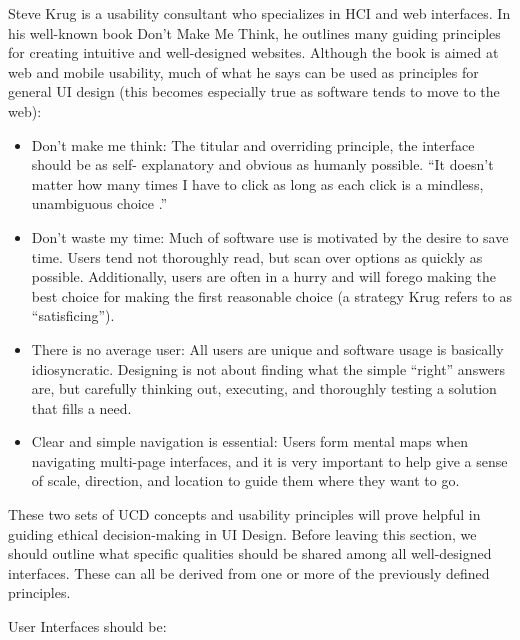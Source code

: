 \documentclass[12pt, oneside]{article}
\begin{document}
Steve Krug is a usability consultant who specializes in HCI and web interfaces. In his well-known book Don't Make Me Think, he outlines many guiding principles for creating intuitive and well-designed websites. Although the book is aimed at web and mobile usability, much of what he says can be used as principles for general UI design (this becomes especially true as software tends to move to the web):

\begin{itemize}
\raggedright
    \item Don't make me think: The titular and overriding principle, the interface should be as self- explanatory and obvious as humanly possible. ``It doesn't matter how many times I have to click as long as each click is a mindless, unambiguous choice \cite[p.~43]{krug_2014}.''
    \item Don't waste my time: Much of software use is motivated by the desire to save time. Users tend not thoroughly read, but scan over options as quickly as possible. Additionally, users are often in a hurry and will forego making the best choice for making the first reasonable choice (a strategy Krug refers to as ``satisficing'').
    \item There is no average user: All users are unique and software usage is basically idiosyncratic. Designing is not about finding what the simple ``right'' answers are, but carefully thinking out, executing, and thoroughly testing a solution that fills a need.
    \item Clear and simple navigation is essential: Users form mental maps when navigating multi-page interfaces, and it is very important to help give a sense of scale, direction, and location to guide them where they want to go.
\end{itemize}

These two sets of UCD concepts and usability principles will prove helpful in guiding ethical decision-making in UI Design. Before leaving this section, we should outline what specific qualities should be shared among all well-designed interfaces. These can all be derived from one or more of the previously defined principles.

User Interfaces should be:
\end{document}
